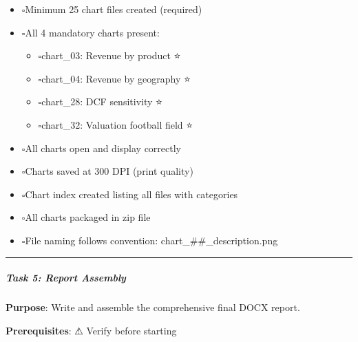 \documentclass[11pt]{article}
\newcommand{\UncheckedBox}{$\square$}
\begin{document}
\begin{itemize}[leftmargin=*,itemsep=2pt,topsep=2pt]
\item {} \UncheckedBox Minimum 25 chart files created (required)
\item {} \UncheckedBox All 4 mandatory charts present:
\begin{itemize}[leftmargin=*,itemsep=2pt,topsep=2pt]
\item {} \UncheckedBox chart\_\allowbreak{}03: Revenue by product ⭐
\item {} \UncheckedBox chart\_\allowbreak{}04: Revenue by geography ⭐
\item {} \UncheckedBox chart\_\allowbreak{}28: DCF sensitivity ⭐
\item {} \UncheckedBox chart\_\allowbreak{}32: Valuation football field ⭐
\end{itemize}
\item {} \UncheckedBox All charts open and display correctly
\item {} \UncheckedBox Charts saved at 300 DPI (print quality)
\item {} \UncheckedBox Chart index created listing all files with categories
\item {} \UncheckedBox All charts packaged in zip file
\item {} \UncheckedBox File naming follows convention: chart\_\allowbreak{}\#\#\_\allowbreak{}description.png
\end{itemize}

\vspace{0.5em}\hrule\vspace{0.5em}

\subparagraph{Task 5: Report Assembly}\mbox{}\par

\textbf{Purpose}: Write and assemble the comprehensive final DOCX report.


\textbf{Prerequisites}: ⚠ Verify before starting
\end{document}
